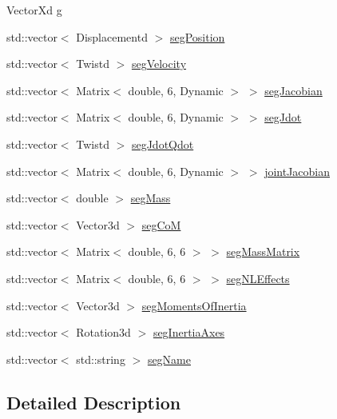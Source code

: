 \begin{DoxyCompactItemize}
\item 
Vector\+Xd \hyperlink{structModel3T_1_1Pimpl_a8a6bd5458703a775e213e47794a59d7d}{g}
\item 
std\+::vector$<$ Displacementd $>$ \hyperlink{structModel3T_1_1Pimpl_a95a2564c9002bdb208279d591fca70ad}{seg\+Position}
\item 
std\+::vector$<$ Twistd $>$ \hyperlink{structModel3T_1_1Pimpl_a53fc477028c2bc87ee7c5e04879e8c20}{seg\+Velocity}
\item 
std\+::vector$<$ Matrix$<$ double, 6, Dynamic $>$ $>$ \hyperlink{structModel3T_1_1Pimpl_ab1a67acf0553a0bf04275f5f20c2a69e}{seg\+Jacobian}
\item 
std\+::vector$<$ Matrix$<$ double, 6, Dynamic $>$ $>$ \hyperlink{structModel3T_1_1Pimpl_af9cd027badf0a713437cd6d1a924cfb6}{seg\+Jdot}
\item 
std\+::vector$<$ Twistd $>$ \hyperlink{structModel3T_1_1Pimpl_a504aa134750da2f42dfe8fa7e431b9cd}{seg\+Jdot\+Qdot}
\item 
std\+::vector$<$ Matrix$<$ double, 6, Dynamic $>$ $>$ \hyperlink{structModel3T_1_1Pimpl_a8dbebd103170b8f5b8aa5ce4dd383696}{joint\+Jacobian}
\item 
std\+::vector$<$ double $>$ \hyperlink{structModel3T_1_1Pimpl_a96656676ff3aa9cddb99f58f453786c7}{seg\+Mass}
\item 
std\+::vector$<$ Vector3d $>$ \hyperlink{structModel3T_1_1Pimpl_add8bdb5e94533189b2173a43102eee84}{seg\+CoM}
\item 
std\+::vector$<$ Matrix$<$ double, 6, 6 $>$ $>$ \hyperlink{structModel3T_1_1Pimpl_a7d3d20f64bbe278275b6e74a49ebf9f6}{seg\+Mass\+Matrix}
\item 
std\+::vector$<$ Matrix$<$ double, 6, 6 $>$ $>$ \hyperlink{structModel3T_1_1Pimpl_a13b0782e9a8fb952f2fa33227277102f}{seg\+N\+L\+Effects}
\item 
std\+::vector$<$ Vector3d $>$ \hyperlink{structModel3T_1_1Pimpl_a4c64f2048ff9ce34719e3ea2a384a263}{seg\+Moments\+Of\+Inertia}
\item 
std\+::vector$<$ Rotation3d $>$ \hyperlink{structModel3T_1_1Pimpl_aeb0889ba54a539cba37b30d2826ad61b}{seg\+Inertia\+Axes}
\item 
std\+::vector$<$ std\+::string $>$ \hyperlink{structModel3T_1_1Pimpl_a2cab0a9da7f7c37d10152cac8c8e6cfc}{seg\+Name}
\end{DoxyCompactItemize}


\subsection{Detailed Description}


